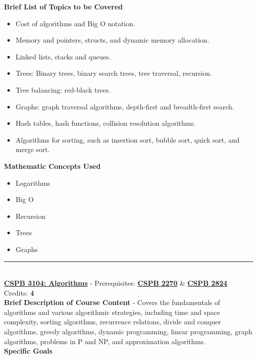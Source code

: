 \documentclass{article}
\newcommand{\horizontalline}{\noindent \rule{\textwidth}{0.5pt} \\}
\begin{document}
\noindent \textbf{Brief List of Topics to be Covered}
\begin{itemize}
    \item Cost of algorithms and Big O notation.
    \item Memory and pointers, structs, and dynamic memory allocation.
    \item Linked lists, stacks and queues.
    \item Trees: Binary trees, binary search trees, tree traversal, recursion.
    \item Tree balancing: red-black trees.
    \item Graphs: graph traversal algorithms, depth-first and breadth-first search.
    \item Hash tables, hash functions, collision resolution algorithms.
    \item Algorithms for sorting, such as insertion sort, bubble sort, quick sort, and merge sort.
\end{itemize}

\noindent \textbf{Mathematic Concepts Used}
\begin{itemize}
    \item Logarithms
    \item Big O
    \item Recursion
    \item Trees
    \item Graphs
\end{itemize}
\horizontalline
\noindent \href{https://www.colorado.edu/program/cspb/cspb-3104-algorithms}{\textbf{CSPB 3104: Algorithms}} - Prerequisites: \href{https://www.colorado.edu/program/cspb/cspb-2270-computer-science-2-data-structures}{\textbf{CSPB 2270}} \& \href{https://www.colorado.edu/program/cspb/cspb-2824-discrete-structures}{\textbf{CSPB 2824}} Credits: \textbf{4} \\

\noindent \textbf{Brief Description of Course Content} - Covers the fundamentals of algorithms and various algorithmic strategies, including time and space complexity, sorting algorithms, recurrence relations, divide and conquer algorithms, greedy algorithms, dynamic programming, linear programming, graph algorithms, problems in P and NP, and approximation algorithms. \\

\noindent \textbf{Specific Goals} \\ 
\end{document}
